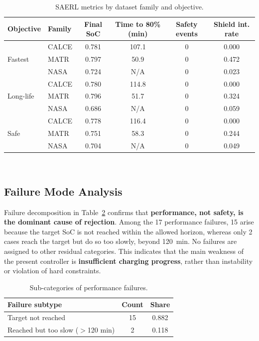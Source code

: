 \documentclass[%
 aip,
 amsmath,amssymb,
reprint, onecolumn %
]{revtex4-1}
\begin{document}
\begin{table}[t]
\centering
\caption{SAERL metrics by dataset family and objective.}
\label{tab_saerl_family_objective}
\begin{tabular}{llcccc}
\toprule
Objective & Family & Final SoC & Time to 80\% (min) & Safety events & Shield int. rate \\
\midrule
 & CALCE & 0.781 & 107.1 & 0 & 0.000 \\
Fastest & MATR & 0.797 & 50.9 & 0 & 0.472 \\
 & NASA & 0.724 & N/A \footnotemark[1] & 0 & 0.023 \\
\midrule
 & CALCE & 0.780 & 114.8 & 0 & 0.000 \\
Long-life & MATR & 0.796 & 51.7 & 0 & 0.324 \\
 & NASA & 0.686 & N/A \footnotemark[1] & 0 & 0.059 \\
\midrule
 & CALCE & 0.778 & 116.4 & 0 & 0.000 \\
Safe & MATR & 0.751 & 58.3 & 0 & 0.244 \\
 & NASA & 0.704 & N/A \footnotemark[1] & 0 & 0.049 \\
\bottomrule
\end{tabular}
\\[3pt]
\raggedright


\end{table}

\subsection{Failure Mode Analysis}

Failure decomposition in Table~\ref{tab_perf_failure_subtypes} confirms that \textbf{performance, not safety, is the dominant cause of rejection}. Among the 17 performance failures, 15 arise because the target SoC is not reached within the allowed horizon, whereas only 2 cases reach the target but do so too slowly, beyond 120~min. No failures are assigned to other residual categories. This indicates that the main weakness of the present controller is \textbf{insufficient charging progress}, rather than instability or violation of hard constraints.

\begin{table}[t]
\centering
\caption{Sub-categories of performance failures.}
\label{tab_perf_failure_subtypes}
\begin{tabular}{lcc}
\toprule
Failure subtype & Count & Share \\
\midrule
Target not reached & 15 & 0.882 \\
Reached but too slow ($>$120 min) & 2 & 0.118 \\
\bottomrule
\end{tabular}
\end{table}
\end{document}
